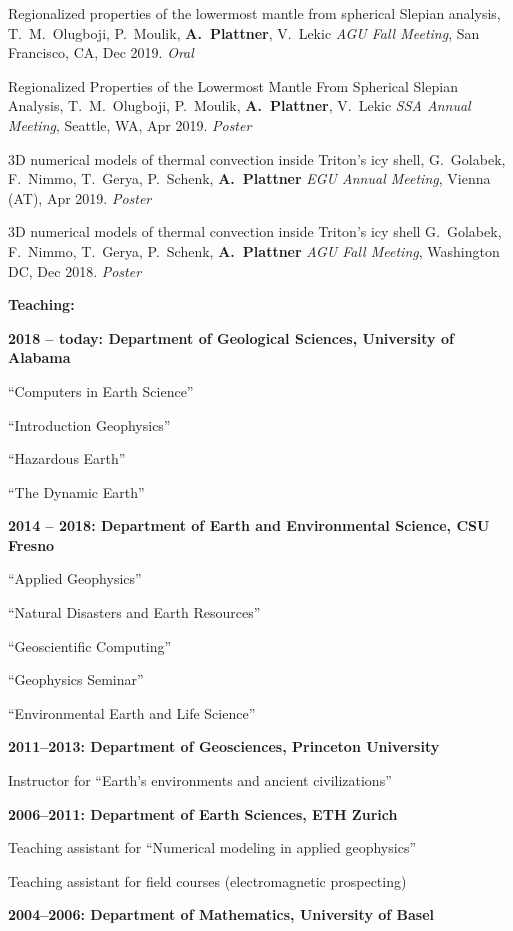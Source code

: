 \documentclass[10pt]{article}
\begin{document}
\spcp
Regionalized properties of the lowermost mantle from spherical Slepian analysis,
T.~M.~Olugboji, P.~Moulik, \textbf{A.~Plattner}, V.~Lekic
\emph{AGU Fall Meeting}, San Francisco, CA, Dec 2019. \emph{Oral}

\spcp Regionalized Properties of the Lowermost Mantle From Spherical
Slepian Analysis, T.~M.~Olugboji, P.~Moulik, \textbf{A.~Plattner},
V.~Lekic \emph{SSA Annual Meeting}, Seattle, WA, Apr
2019. \emph{Poster}

\spcp 3D numerical models of thermal convection inside Triton’s icy
shell, G.~Golabek, F.~Nimmo, T.~Gerya, P.~Schenk, \textbf{A.~Plattner}
\emph{EGU Annual Meeting}, Vienna (AT), Apr 2019. \emph{Poster}

\spcp 3D numerical models of thermal convection inside Triton's icy
shell G.~Golabek, F.~Nimmo, T.~Gerya, P.~Schenk, \textbf{A.~Plattner}
\emph{AGU Fall Meeting}, Washington DC, Dec 2018. \emph{Poster}





\spc
\textbf{\tsize Teaching:}

\spcp
\textbf{2018 -- today: Department of Geological Sciences,
University of Alabama}

``Computers in Earth Science''

``Introduction Geophysics''

``Hazardous Earth''

``The Dynamic Earth''

\spcp
\textbf{2014 -- 2018:  Department of Earth and Environmental Science, CSU Fresno}

``Applied Geophysics''

``Natural Disasters and Earth Resources''

``Geoscientific Computing''

``Geophysics Seminar''

``Environmental Earth and Life Science''


\spcp
\textbf{2011--2013:  Department of Geosciences, Princeton University}

Instructor for ``Earth's environments and ancient civilizations''

\spcp
\textbf{2006--2011: Department of Earth Sciences, ETH Zurich}

Teaching assistant for ``Numerical modeling in applied geophysics''
     
Teaching assistant for field courses (electromagnetic prospecting)

\spcp
\textbf{2004--2006: Department of Mathematics, University of Basel}
\end{document}
